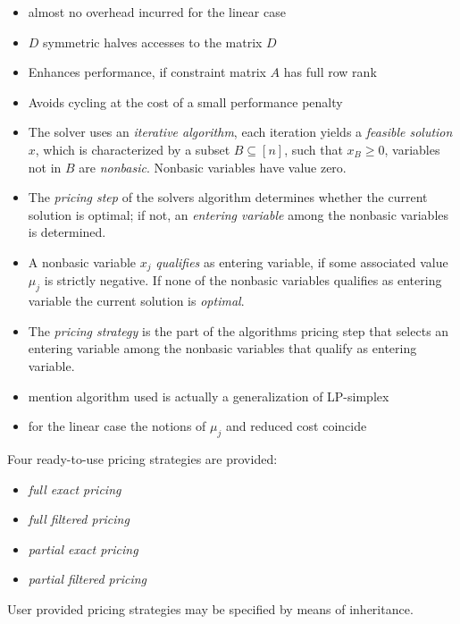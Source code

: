 \documentclass{slides}
\begin{document}
\begin{note}
\begin{itemize}
\item almost no overhead incurred for the linear case
\item $D$ symmetric halves accesses to the matrix $D$
\item Enhances performance, if constraint matrix $A$ has full row rank
\item Avoids cycling at the cost of a small performance penalty 
\end{itemize}
\end{note}

\begin{slide}
\begin{itemize}
\item The solver uses an \emph{iterative algorithm}, each iteration yields a
\emph{feasible solution} $x$, which is characterized by a subset
$B \subseteq \left[n\right]$, such that $x_{B} \geq 0$, variables not in $B$
are \emph{nonbasic}. Nonbasic variables have value zero.   

\item The \emph{pricing step} of the solvers algorithm
determines whether the current solution is optimal;
if not, an \emph{entering variable} among the nonbasic variables is determined.

\item A nonbasic variable $x_{j}$ \emph{qualifies} as entering variable,
if some associated value $\mu_{j}$ is strictly negative. If none of the
nonbasic variables qualifies as entering variable the current solution is
\emph{optimal}.

\item The \emph{pricing strategy} is the part of the algorithms
pricing step that selects an entering variable among the
nonbasic variables that qualify as entering variable.
\end{itemize}
\end{slide}

\begin{note}
\begin{itemize}
\item mention algorithm used is actually a generalization of LP-simplex
\item for the linear case the notions of $\mu_{j}$ and reduced cost coincide
\end{itemize}
\end{note}

\begin{slide}
Four ready-to-use pricing strategies are provided:
\begin{itemize}
\item \emph{full exact pricing} 
\item \emph{full filtered pricing}
\item \emph{partial exact pricing}
\item \emph{partial filtered pricing}
\end{itemize}
User provided pricing strategies may be specified by means of inheritance.
\end{slide}
\end{document}
